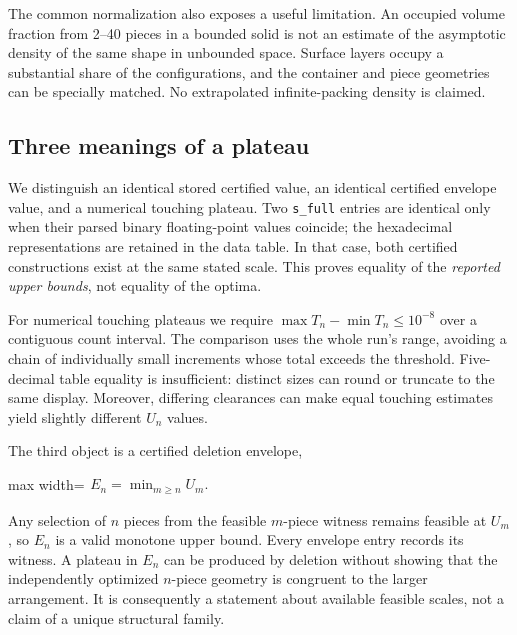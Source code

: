 \documentclass[11pt,a4paper]{article}
\begin{document}
The common normalization also exposes a useful limitation. An occupied volume fraction from 2--40 pieces in a bounded solid is not an estimate of the asymptotic density of the same shape in unbounded space. Surface layers occupy a substantial share of the configurations, and the container and piece geometries can be specially matched. No extrapolated infinite-packing density is claimed.

\subsection{Three meanings of a plateau}

We distinguish an identical stored certified value, an identical certified envelope value, and a numerical touching plateau. Two \nolinkurl{s_full} entries are identical only when their parsed binary floating-point values coincide; the hexadecimal representations are retained in the data table. In that case, both certified constructions exist at the same stated scale. This proves equality of the \emph{reported upper bounds}, not equality of the optima.

For numerical touching plateaus we require $\max T_n-\min T_n\le10^{-8}$ over a contiguous count interval. The comparison uses the whole run's range, avoiding a chain of individually small increments whose total exceeds the threshold. Five-decimal table equality is insufficient: distinct sizes can round or truncate to the same display. Moreover, differing clearances can make equal touching estimates yield slightly different $U_n$ values.

The third object is a certified deletion envelope,

\begin{center}\begin{adjustbox}{max width=\linewidth}$\displaystyle\begin{aligned}
E_n=\min_{m\ge n} U_m.
\end{aligned}$\end{adjustbox}\end{center}

Any selection of $n$ pieces from the feasible $m$-piece witness remains feasible at $U_m$, so $E_n$ is a valid monotone upper bound. Every envelope entry records its witness. A plateau in $E_n$ can be produced by deletion without showing that the independently optimized $n$-piece geometry is congruent to the larger arrangement. It is consequently a statement about available feasible scales, not a claim of a unique structural family.
\end{document}
